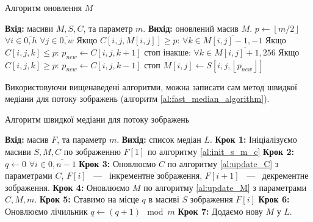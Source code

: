\begin{algorithm}[H]
    \caption{Алгоритм оновлення $M$}
    \label{al:update_M}
    \begin{algorithmic}
        \State \textbf{Вхід:} масиви $M, S, C$, та параметр $m$.
        \State \textbf{Вихід:} оновлений масив $M$.
        \State $p \gets \left\lfloor m/2 \right\rfloor$ 
        \State $\forall i \in \overline{0,h}$
        \State \qquad  $\forall j \in \overline{0,w}$
        \State \qquad \qquad  Якщо $C[i,j, M[i,j]] \geq p$:
        \State \qquad \qquad \qquad $\forall k \in \overline{M[i,j]-1,-1}$
        \State \qquad \qquad \qquad \qquad  Якщо $C[i,j,k] \leq p$:
        \State \qquad \qquad \qquad \qquad \qquad $p_{new} \gets C[i,j,k+1]$
        \State \qquad \qquad \qquad \qquad \qquad стоп
        \State \qquad \qquad інакше:
        \State \qquad \qquad \qquad $\forall k \in \overline{M[i,j]+1,256}$
        \State \qquad \qquad \qquad \qquad  Якщо $C[i,j,k] \geq p$:
        \State \qquad \qquad \qquad \qquad \qquad $p_{new} \gets C[i,j,k-1]$
        \State \qquad \qquad \qquad \qquad \qquad стоп
        \State \qquad \qquad $M[i,j] \gets S[i,j, \left\lfloor p_{new}\right\rfloor ]$
    \end{algorithmic}
\end{algorithm}

Використовуючи вищенаведені алгоритми,
можна записати сам метод швидкої медіани для потоку зображень (алгоритм \ref{al:fast_median_algorithm}).

\begin{algorithm}[H]
    \caption{Алгоритм швидкої медіани для потоку зображень}
    \label{al:fast_median_algorithm}
    \begin{algorithmic}
        \State \textbf{Вхід:} масив $F$, та параметр $m$.
        \State \textbf{Вихід:} список медіан $L$.
        \State \textbf{Крок 1:} Ініціалізуємо масиви $S, M, C$ по зображенню $F[1]$ по алгоритму \ref{al:init_s_m_c}
        \State \textbf{Крок 2:} $q \gets 0$ 
        \State  $\forall i \in \overline{0,n-1}$
        \State \qquad \textbf{Крок 3:} Оновлюємо $C$ по алгоритму \ref{al:update_C} з параметрами $C$,
        $F[i]$ ~---~ інкрементне зображення, $F[i+1]$ ~---~ декрементне зображення.
        \State \qquad \textbf{Крок 4:} Оновлюємо $M$ по алгоритму \ref{al:update_M} з параметрами $C, M, m$.
        \State \qquad \textbf{Крок 5:} Ставимо на місце $q$ в масиві $S$ зображення $F[i]$
        \State \qquad \textbf{Крок 6:} Оновлюємо лічильник $q \gets (q+1) \mod m$
        \State \qquad \textbf{Крок 7:} Додаємо нову $M$ у $L$.
    \end{algorithmic}
\end{algorithm}

